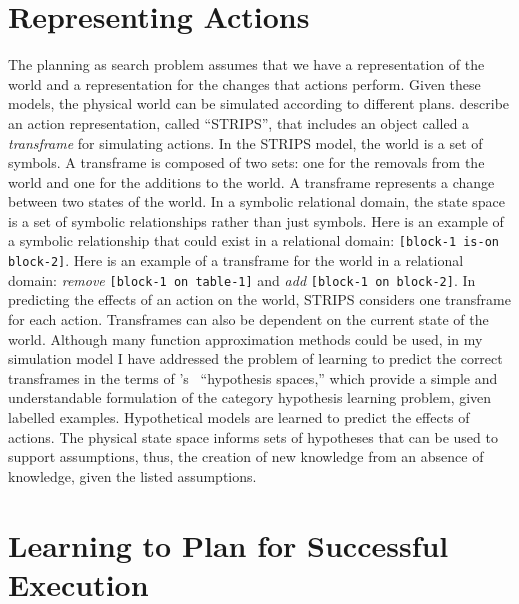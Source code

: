 \section{Representing Actions}

The planning as search problem assumes that we have a representation
of the world and a representation for the changes that actions
perform.  Given these models, the physical world can be simulated
according to different plans.  \cite{fikes:1972} describe an action
representation, called ``STRIPS'', that includes an object called a
\emph{transframe} for simulating actions.  In the STRIPS model, the
world is a set of symbols.  A transframe is composed of two sets: one
for the removals from the world and one for the additions to the
world.  A transframe represents a change between two states of the
world.  In a symbolic relational domain, the state space is a set of
symbolic relationships rather than just symbols.  Here is an example
of a symbolic relationship that could exist in a relational domain:
{\tt [block-1 is-on block-2]}.  Here is an example of a transframe for
the world in a relational domain: \emph{remove} {\tt [block-1 on
    table-1]} and \emph{add} {\tt [block-1 on block-2]}.  In
predicting the effects of an action on the world, STRIPS considers one
transframe for each action.  Transframes can also be dependent on the
current state of the world.  Although many function approximation
methods could be used, in my simulation model I have addressed the
problem of learning to predict the correct transframes in the terms of
{\mbox{\citeauthor{mitchell:1982}'s~\citeyearpar{mitchell:1982}}}
``hypothesis spaces,'' which provide a simple and understandable
formulation of the category hypothesis learning problem, given
labelled examples.  Hypothetical models are learned to predict the
effects of actions.  The physical state space informs sets of
hypotheses that can be used to support assumptions, thus, the creation
of new knowledge from an absence of knowledge, given the listed
assumptions.

\section{Learning to Plan for Successful Execution}

